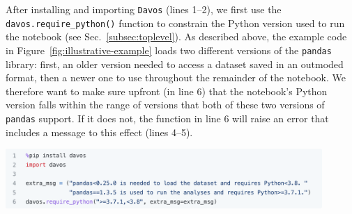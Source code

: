 \documentclass[preprint,12pt,a4paper]{elsarticle}
\begin{document}
After installing and importing \texttt{Davos} (lines 1--2), we first use the \texttt{davos.require\_\-python()} function to constrain the Python version used to run the notebook (see Sec.~\ref{subsec:toplevel}).
As described above, the example code in Figure~\ref{fig:illustrative-example} loads two different versions of the \texttt{pandas} library: first, an older version needed to access a dataset saved in an outmoded format, then a newer one to use throughout the remainder of the notebook.
We therefore want to make sure upfront (in line 6) that the notebook's Python version falls within the range of versions that both of these two versions of \texttt{pandas} support.
If it does not, the function in line 6 will raise an error that includes a message to this effect (lines 4--5).
\begin{center}
\includegraphics[width=0.9\textwidth]{figs/example1}
\end{center}
\end{document}
